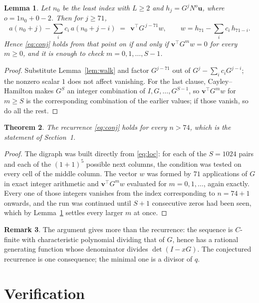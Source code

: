\documentclass[11pt,a4paper]{article}
\theoremstyle{plain}
\newtheorem{theorem}{Theorem}
\newtheorem{lemma}[theorem]{Lemma}
\theoremstyle{definition}
\newtheorem{remark}[theorem]{Remark}
\begin{document}
\begin{lemma}\label{lem:crit}
Let $n_0$ be the least index with $L\ge2$ and $h_j=G^{j}N^{o}\mathbf{u}$, where
$o=1n_0+0-2$. Then for $j\ge71$,
\[
a(n_0+j)-\sum_i c_i\,a(n_0+j-i)\;=\;\,\mathbf{v}^{\!\top}G^{\,j-71}w,
\qquad w=h_{71}-\sum_i c_i\,h_{71-i} .
\]
Hence \eqref{eq:conj} holds from that point on if and only if
$\mathbf{v}^{\!\top}G^{m}w=0$ for every $m\ge0$, and it is enough to check
$m=0,1,\dots,S-1$.
\end{lemma}

\begin{proof}
Substitute Lemma~\ref{lem:walk} and factor $G^{j-71}$ out of
$G^{j}-\sum_ic_iG^{j-i}$; the nonzero scalar $1$ does not affect
vanishing. For the last clause, Cayley--Hamilton makes $G^{S}$ an integer combination of
$I,G,\dots,G^{S-1}$, so $\mathbf{v}^{\!\top}G^{m}w$ for $m\ge S$ is the corresponding
combination of the earlier values; if those vanish, so do all the rest.
\end{proof}

\begin{theorem}
The recurrence \eqref{eq:conj} holds for every $n>74$, which is the statement of
Section~1.
\end{theorem}

\begin{proof}
The digraph was built directly from \eqref{eq:loc}: for each of the $S=1024$ pairs and each
of the $(1+1)^{5}$ possible next columns, the condition was tested on every cell of
the middle column. The vector $w$ was formed by $71$ applications of $G$ in exact integer
arithmetic and $\mathbf{v}^{\!\top}G^{m}w$ evaluated for $m=0,1,\dots$, again exactly.
Every one of those integers vanishes from the index corresponding to $n=74+1$ onwards,
and the run was continued until $S+1$ consecutive zeros had been seen, which by
Lemma~\ref{lem:crit} settles every larger $m$ at once.
\end{proof}

\begin{remark}
The argument gives more than the recurrence: the sequence is $C$-finite with characteristic
polynomial dividing that of $G$, hence has a rational generating function whose denominator
divides $\det(I-xG)$. The conjectured recurrence is one consequence; the minimal one is a
divisor of $q$.
\end{remark}

\section{Verification}
\end{document}
